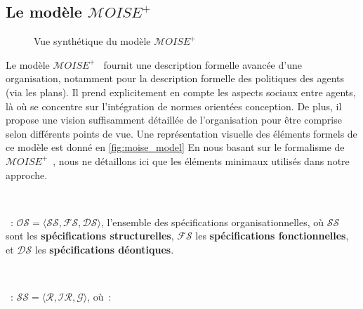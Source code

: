 \subsection{Le modèle $\mathcal{M}OISE^+$}

\begin{figure}[h!]
  \centering
  
  \caption{Vue synthétique du modèle $\mathcal{M}OISE^+$}
  \label{fig:moise_model}
\end{figure}

Le modèle $\mathcal{M}OISE^+$~\citep{Hubner2002} fournit une description formelle avancée d'une organisation, notamment pour la description formelle des politiques des agents (via les plans). Il prend explicitement en compte les aspects sociaux entre agents, là où  se concentre sur l'intégration de normes orientées conception. De plus, il propose une vision suffisamment détaillée de l'organisation pour être comprise selon différents points de vue. Une représentation visuelle des éléments formels de ce modèle est donné en \autoref{fig:moise_model}
En nous basant sur le formalisme de $\mathcal{M}OISE^+$~\citep{hubner2007moise}, nous ne détaillons ici que les éléments minimaux utilisés dans notre approche.

\

\noindent \textbf{}~: \quad $\mathcal{OS} = \langle \mathcal{SS}, \mathcal{FS}, \mathcal{DS} \rangle$, l'ensemble des spécifications organisationnelles, où $\mathcal{SS}$ sont les \textbf{spécifications structurelles}, $\mathcal{FS}$ les \textbf{spécifications fonctionnelles}, et $\mathcal{DS}$ les \textbf{spécifications déontiques}.

\

\noindent \textbf{}~: \quad $\mathcal{SS} = \langle \mathcal{R}, \mathcal{IR}, \mathcal{G} \rangle$, où~:

